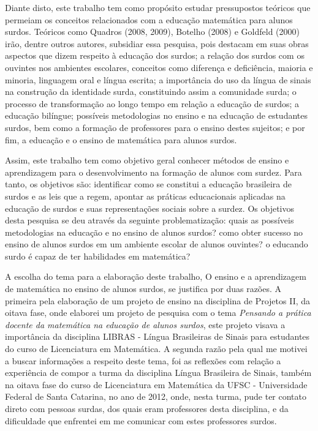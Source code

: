 \documentclass[brasil]{abnt}
\begin{document}
	Diante disto, este trabalho tem como propósito estudar pressupostos teóricos que permeiam os conceitos relacionados com a educação matemática para alunos surdos. Teóricos como Quadros (2008, 2009), Botelho (2008) e
	Goldfeld (2000) irão, dentre outros autores, subsidiar essa pesquisa, pois destacam em suas obras aspectos que dizem respeito à educação dos surdos; a relação dos surdos com os ouvintes nos ambientes 
	escolares, conceitos como diferença e deficiência, maioria e minoria, linguagem oral e língua escrita; a importância do uso da língua de sinais na construção da identidade surda, constituindo assim a comunidade
	surda; o processo de transformação ao longo tempo em relação a educação de surdos; a educação bilíngue; possíveis metodologias no ensino e na educação de estudantes surdos, bem como a formação de professores para 
	o ensino destes sujeitos; e por fim, a educação e o ensino de matemática para alunos surdos. 
	
	Assim, este trabalho tem como objetivo geral conhecer métodos de ensino e aprendizagem para o desenvolvimento na formação de alunos com surdez. Para tanto, os objetivos são: identificar como se constitui a educação 
	brasileira de surdos e as leis que a regem, apontar as práticas educacionais aplicadas na educação de surdos e suas representações sociais sobre a surdez. Os objetivos desta pesquisa se deu através da seguinte problematização:
	quais as possíveis metodologias na educação e no ensino de alunos surdos? como obter sucesso no ensino de alunos surdos em um ambiente escolar de alunos ouvintes? o educando surdo é capaz de ter habilidades em matemática?  
	
	A escolha do tema para a elaboração deste trabalho, O ensino e a aprendizagem de matemática no ensino de alunos surdos, se justifica por duas razões. A primeira pela elaboração de um projeto de ensino na disciplina de Projetos II, 
	da oitava fase, onde elaborei um projeto de pesquisa com o tema \textit{Pensando a prática docente da matemática na educação de alunos surdos}, este projeto visava a importância da disciplina LIBRAS - Língua Brasileiras de Sinais
	para estudantes do curso de Licenciatura em Matemática. A segunda razão pela qual me motivei a buscar informações a respeito deste tema, foi as reflexões com relação a experiência de compor a turma da disciplina Língua 
	Brasileira de Sinais, também na oitava fase do curso de Licenciatura em Matemática da UFSC - Universidade Federal de Santa Catarina, no ano de 2012, onde, nesta turma, pude ter contato direto com pessoas surdas, dos quais 
	eram professores desta disciplina, e da dificuldade que enfrentei em me comunicar com estes professores surdos. 
	
\end{document}

